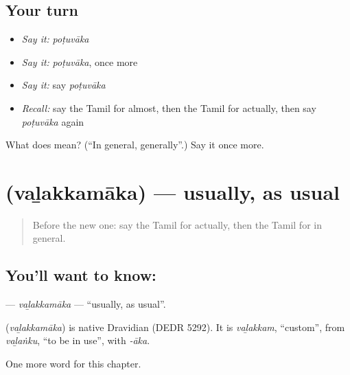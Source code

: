 \subsection*{Your turn}
\begin{itemize}
\raggedright
  \item \emph{Say it:} \emph{poṭuvāka}
  \item \emph{Say it:} \emph{poṭuvāka}, once more
  \item \emph{Say it:} say \emph{poṭuvāka}
  \item \emph{Recall:} say the Tamil for almost, then the Tamil for actually, then say \emph{poṭuvāka} again
\end{itemize}

\begin{tcolorbox}[breakable,colback=teal!4,colframe=teal!35!black,title={Before you move on}]
What does  mean? (\textquotedblleft{}In general, generally\textquotedblright{}.) Say it once more.
\end{tcolorbox}
\section[\texorpdfstring{\ta{வழக்கமாக} (vaḻakkamāka)}{வழக்கமாக (vaḻakkamāka)}]{ (vaḻakkamāka) — usually, as usual}

\label{lesson:TA-C207-valakkamaka}



\begin{quote}
Before the new one: say the Tamil for actually, then the Tamil for in general.
\end{quote}

\subsection*{You'll want to know: }
\textbf{} — \emph{vaḻakkamāka} — \textquotedblleft{}usually, as usual\textquotedblright{}.

\begin{cousinweb}
\textbf{} (\emph{vaḻakkamāka}) is native Dravidian (DEDR 5292). It is \emph{vaḻakkam}, \textquotedblleft{}custom\textquotedblright{}, from \emph{vaḻaṅku}, \textquotedblleft{}to be in use\textquotedblright{}, with \emph{-āka}.
\end{cousinweb}

\begin{grammarlens}[title={What you've built}]
One more word for this chapter.
\end{grammarlens}

